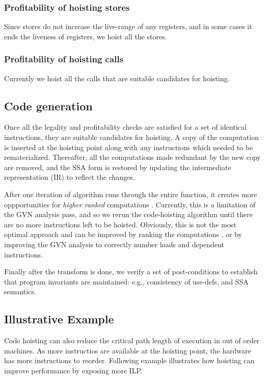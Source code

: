 \documentclass{sig-alternate}
\begin{document}
\subsubsection{Profitability of hoisting stores}
Since stores do not increase the live-range of any registers, and in some cases
it ends the liveness of registers, we hoist all the stores.

\subsubsection{Profitability of hoisting calls}
Currently we hoist all the calls that are suitable candidates for hoisting.

\subsection{Code generation}
Once all the legality and profitability checks are satisfied for a set of
identical instructions, they are suitable candidates for hoisting. A copy of the
computation is inserted at the hoisting point along with any instructions which
needed to be rematerialized. Thereafter, all the computations made redundant by
the new copy are removed, and the SSA form is restored by updating the
intermediate representation (IR) to reflect the changes.

After one iteration of algorithm runs through the entire function, it creates
more oppportunities for \emph{higher ranked} computations
\cite{rosen1988global}. Currently, this is a limitation of the GVN analysis
pass, and so we rerun the code-hoisting algorithm until there are no more
instructions left to be hoisted.  Obviously, this is not the most optimal
approach and can be improved by ranking the computations \cite{rosen1988global},
or by improving the GVN analysis to correctly number loads and dependent
instructions.

Finally after the transform is done, we verify a set of post-conditions to
establish that program invariants are maintained: e.g., consistency of
use-defs, and SSA semantics.

\newpage

\subsection{Illustrative Example}
Code hoisting can also reduce the critical path length of execution in out of
order machines. As more instructios are available at the hoisting point, the
hardware has more instructions to reorder. Following example illustrates how
hoisting can improve performance by exposing more ILP.
\end{document}
